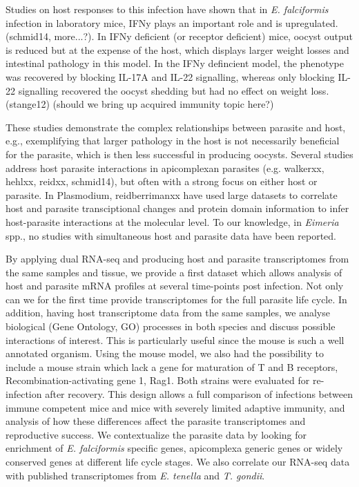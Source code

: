 \documentclass{bmcart}
\begin{document}
Studies on host responses to this infection have shown that in \textit{E. falciformis} infection in laboratory mice, IFNy plays an important role and is upregulated. (schmid14, more...?). In IFNy deficient (or receptor deficient) mice, oocyst output is reduced but at the expense of the host, which displays larger weight losses and intestinal pathology in this model. In the IFNy defincient model, the phenotype was recovered by blocking IL-17A and IL-22 signalling, whereas only blocking IL-22 signalling recovered the oocyst shedding but had no effect on weight loss. (stange12) (should we bring up acquired immunity topic here?)

These studies demonstrate the complex relationships between parasite and host, e.g., exemplifying that larger pathology in the host is not necessarily beneficial for the parasite, which is then less successful in producing oocysts. Several studies address host parasite interactions in apicomplexan parasites (e.g. walkerxx, hehlxx, reidxx, schmid14), but often with a strong focus on either host or parasite. In Plasmodium, reidberrimanxx have used large datasets to correlate host and parasite transciptional changes and protein domain information to infer host-parasite interactions at the molecular level. To our knowledge, in \textit{Eimeria} spp., no studies with simultaneous host and parasite data have been reported. 

By applying dual RNA-seq and producing host and parasite transcriptomes from the same samples and tissue, we provide a first dataset which allows analysis of host and parasite mRNA profiles at several time-points post infection. Not only can we for the first time provide transcriptomes for the full parasite life cycle. In addition, having host transcriptome data from the same samples, we analyse biological (Gene Ontology, GO) processes in both species and discuss possible interactions of interest. This is particularly useful since the mouse is such a well annotated organism. 
Using the mouse model, we also had the possibility to include a mouse strain which lack a gene for maturation of T and B receptors, Recombination-activating gene 1, Rag1. Both strains were evaluated for re-infection after recovery. This design allows a full comparison of infections between immune competent mice and mice with severely limited adaptive immunity, and analysis of how these differences affect the parasite transcriptomes and reproductive success. We contextualize the parasite data by looking for enrichment of \textit{E. falciformis} specific genes, apicomplexa generic genes or widely conserved genes at different life cycle stages. We also correlate our RNA-seq data with published transcriptomes from \textit{E. tenella} and \textit{T. gondii}. 
\end{document}
